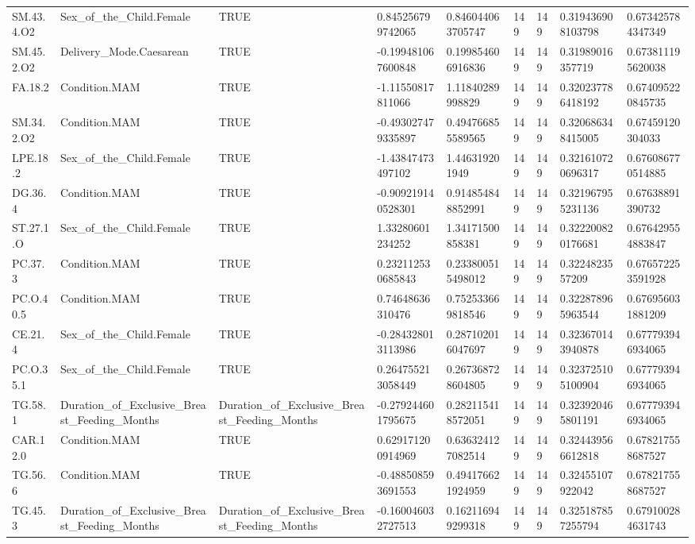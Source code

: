 \begin{longtable}{lllllllll}
SM.43.4.O2 & Sex\_of\_the\_Child.Female & TRUE & 0.845256799742065 & 0.846044063705747 & 149 & 149 & 0.319436908103798 & 0.673425784347349 \\
SM.45.2.O2 & Delivery\_Mode.Caesarean & TRUE & -0.199481067600848 & 0.199854606916836 & 149 & 149 & 0.31989016357719 & 0.673811195620038 \\
FA.18.2 & Condition.MAM & TRUE & -1.11550817811066 & 1.11840289998829 & 149 & 149 & 0.320237786418192 & 0.674095220845735 \\
SM.34.2.O2 & Condition.MAM & TRUE & -0.493027479335897 & 0.494766855589565 & 149 & 149 & 0.320686348415005 & 0.67459120304033 \\
LPE.18.2 & Sex\_of\_the\_Child.Female & TRUE & -1.43847473497102 & 1.446319201949 & 149 & 149 & 0.321610720696317 & 0.676086770514885 \\
DG.36.4 & Condition.MAM & TRUE & -0.909219140528301 & 0.914854848852991 & 149 & 149 & 0.321967955231136 & 0.67638891390732 \\
ST.27.1.O & Sex\_of\_the\_Child.Female & TRUE & 1.33280601234252 & 1.34171500858381 & 149 & 149 & 0.322200820176681 & 0.676429554883847 \\
PC.37.3 & Condition.MAM & TRUE & 0.232112530685843 & 0.233800515498012 & 149 & 149 & 0.3224823557209 & 0.676572253591928 \\
PC.O.40.5 & Condition.MAM & TRUE & 0.74648636310476 & 0.752533669818546 & 149 & 149 & 0.322878965963544 & 0.676956031881209 \\
CE.21.4 & Sex\_of\_the\_Child.Female & TRUE & -0.284328013113986 & 0.287102016047697 & 149 & 149 & 0.323670143940878 & 0.677793946934065 \\
PC.O.35.1 & Sex\_of\_the\_Child.Female & TRUE & 0.264755213058449 & 0.267368728604805 & 149 & 149 & 0.323725105100904 & 0.677793946934065 \\
TG.58.1 & Duration\_of\_Exclusive\_Breast\_Feeding\_Months & Duration\_of\_Exclusive\_Breast\_Feeding\_Months & -0.279244601795675 & 0.282115418572051 & 149 & 149 & 0.323920465801191 & 0.677793946934065 \\
CAR.12.0 & Condition.MAM & TRUE & 0.629171200914969 & 0.636324127082514 & 149 & 149 & 0.324439566612818 & 0.678217558687527 \\
TG.56.6 & Condition.MAM & TRUE & -0.488508593691553 & 0.494176621924959 & 149 & 149 & 0.32455107922042 & 0.678217558687527 \\
TG.45.3 & Duration\_of\_Exclusive\_Breast\_Feeding\_Months & Duration\_of\_Exclusive\_Breast\_Feeding\_Months & -0.160046032727513 & 0.162116949299318 & 149 & 149 & 0.325187857255794 & 0.679100284631743 \\

\end{longtable}
